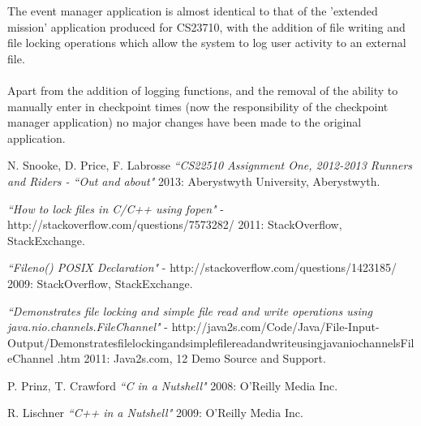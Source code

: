 \documentclass[a4paper, 10pt]{article}
\begin{document}
The event manager application is almost identical to that of the 'extended mission' application produced for CS23710, with the addition of file writing and file locking operations which allow the system to log user activity to an external file. \\\\
Apart from the addition of logging functions, and the removal of the ability to manually enter in checkpoint times (now the responsibility of the checkpoint manager application) no major changes have been made to the original application. 



\begin{thebibliography}{1}

   N. Snooke, D. Price, F. Labrosse {\em ``CS22510 Assignment One, 2012-2013 Runners and Riders - ``Out and about"} 2013: Aberystwyth University, Aberystwyth.
 
  {\em ``How to lock files in C/C++ using fopen"}  - http://stackoverflow.com/questions/7573282/ 2011: StackOverflow, StackExchange.
 
   {\em ``Fileno() POSIX Declaration"}  - http://stackoverflow.com/questions/1423185/ 2009: StackOverflow, StackExchange.
 
   {\em ``Demonstrates file locking and simple file read and write operations using java.nio.channels.FileChannel"}  - http://java2s.com/Code/Java/File-Input-Output/DemonstratesfilelockingandsimplefilereadandwriteusingjavaniochannelsFileChannel .htm 2011: Java2s.com, 12 Demo Source and Support.
 
   P. Prinz, T. Crawford {\em ``C in a Nutshell"} 2008: O'Reilly Media Inc.
  
   R. Lischner {\em ``C++ in a Nutshell"} 2009: O'Reilly Media Inc.
  
\end{thebibliography}
\end{document}

